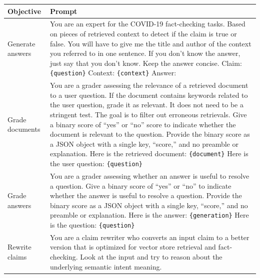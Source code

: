 \begin{table}
\centering

\begin{tabular}{l p{}}
\toprule
\textbf{Objective} & \textbf{Prompt} \\
\midrule

Generate answers & 
You are an expert for the COVID-19 fact-checking tasks. Based on pieces of retrieved context to detect if the claim is true or false. You will have to give me the title and author of the context you referred to in one sentence. If you don’t know the answer, just say that you don’t know. Keep the answer concise. \newline \newline
Claim: \texttt{\{question\}} \newline
Context: \texttt{\{context\}} \newline
Answer: \\

\addlinespace

Grade documents & 
You are a grader assessing the relevance of a retrieved document to a user question. If the document contains keywords related to the user question, grade it as relevant. It does not need to be a stringent test. The goal is to filter out erroneous retrievals. Give a binary score of “yes” or “no” score to indicate whether the document is relevant to the question. Provide the binary score as a JSON object with a single key, “score,” and no preamble or explanation. \newline \newline
Here is the retrieved document: \texttt{\{document\}} \newline
Here is the user question: \texttt{\{question\}} \\

\addlinespace

Grade answers & 
You are a grader assessing whether an answer is useful to resolve a question. Give a binary score of “yes” or “no” to indicate whether the answer is useful to resolve a question. Provide the binary score as a JSON object with a single key, “score,” and no preamble or explanation. \newline \newline
Here is the answer: \texttt{\{generation\}} \newline
Here is the question: \texttt{\{question\}} \\

\addlinespace

Rewrite claims &
You are a claim rewriter who converts an input claim to a better version that is optimized for vector store retrieval and fact-checking. Look at the input and try to reason about the underlying semantic intent meaning. \\

\bottomrule
\end{tabular}
\end{table}